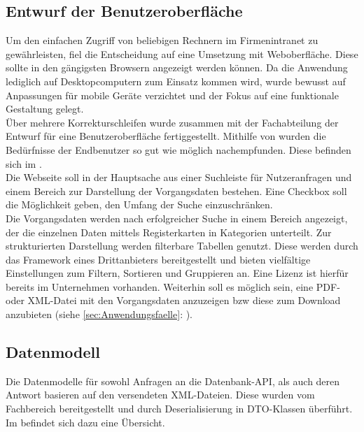 \subsection{Entwurf der Benutzeroberfläche}
\label{sec:Benutzeroberflaeche} 
Um den einfachen Zugriff von beliebigen Rechnern im Firmenintranet zu gewährleisten,
fiel die Entscheidung auf eine Umsetzung mit Weboberfläche. Diese sollte in den gängigsten Browsern angezeigt werden können.
Da die Anwendung lediglich auf Desktopcomputern zum Einsatz kommen wird, wurde bewusst auf Anpassungen für mobile Geräte verzichtet
und der Fokus auf eine funktionale Gestaltung gelegt.\\
Über mehrere Korrekturschleifen wurde zusammen mit der Fachabteilung der Entwurf für eine Benutzeroberfläche
fertiggestellt. Mithilfe von  wurden die Bedürfnisse der Endbenutzer so gut wie möglich nachempfunden.
Diese befinden sich im .\\
Die Webseite soll in der Hauptsache aus einer Suchleiste für Nutzeranfragen und einem Bereich zur Darstellung der Vorgangsdaten
bestehen. Eine Checkbox soll die Möglichkeit geben, den Umfang der Suche einzuschränken.\\
Die Vorgangsdaten werden nach erfolgreicher Suche in einem Bereich angezeigt, der die einzelnen Daten mittels Registerkarten
in Kategorien unterteilt. Zur strukturierten Darstellung werden filterbare Tabellen genutzt. Diese werden durch das
Framework  eines Drittanbieters bereitgestellt und bieten vielfältige Einstellungen zum Filtern,
Sortieren und Gruppieren an. Eine Lizenz ist hierfür bereits im Unternehmen vorhanden.
Weiterhin soll es möglich sein, eine \acs{PDF}- oder \acs{XML}-Datei mit den Vorgangsdaten anzuzeigen \acs{bzw} diese zum 
Download anzubieten (siehe \ref{sec:Anwendungsfaelle}: ).


\subsection{Datenmodell}
\label{sec:Datenmodell}
Die Datenmodelle für sowohl Anfragen an die Datenbank-API, als auch deren Antwort basieren auf den versendeten XML-Dateien. 
Diese wurden vom Fachbereich bereitgestellt und durch Deserialisierung in \acs{DTO}-Klassen überführt.\\
Im  befindet sich dazu eine Übersicht. 

